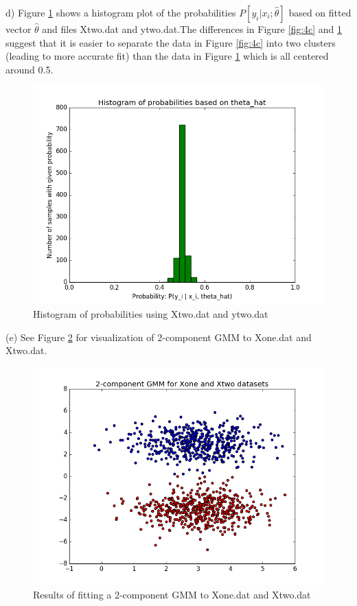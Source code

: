 \documentclass[11pt]{article}
\newenvironment{problem}[2][Problem]{\begin{trivlist}
\item[\hskip \labelsep {\bfseries #1}\hskip \labelsep {\bfseries #2.}]}{\end{trivlist}}
\begin{document}
\begin{problem}{2.4}
(d) Figure \ref{fig:4d} shows a histogram plot of the probabilities $P[y_i | x_i;\hat{\theta}]$  based on fitted vector $\hat{\theta}$ and files Xtwo.dat and ytwo.dat.The differences in Figure \ref{fig:4c} and \ref{fig:4d} suggest that it is easier to separate the data in Figure \ref{fig:4c} into two clusters (leading to more accurate fit) than the data in Figure \ref{fig:4d} which is all centered around 0.5.
\begin{figure}[h!]
  \centering
  \includegraphics[scale=0.5]{figs/4d.png}
  \caption{Histogram of probabilities using Xtwo.dat and ytwo.dat}
  \label{fig:4d}
\end{figure}

(e) See Figure \ref{fig:4e} for visualization of 2-component GMM to Xone.dat and Xtwo.dat.
\begin{figure}[h!]
  \centering
  \includegraphics[scale=0.5]{figs/4e.png}
  \caption{Results of fitting a 2-component GMM to Xone.dat and Xtwo.dat}
  \label{fig:4e}
\end{figure}


\end{problem}
\end{document}
